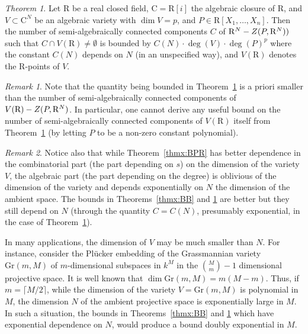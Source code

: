 \documentclass[10pt]{amsart}
\theoremstyle{definition}
\theoremstyle{remark}
\newtheorem{remark}{Remark}
\newtheorem{thmx}{Theorem}
\numberwithin{equation}{section}
\newcommand {\R} {\mathrm{R}}
\newcommand {\C}     {\mathrm{C}}
\newcommand {\ZZ} {{\rm Z}}
\begin{document}
\begin{thmx} \cite[Theorem 2.12]{Walsh2}
\label{thmx:Walsh}
Let $\R$ be a real closed field, $\C = \R[i]$ the algebraic closure of $\R$, and $V \subset \C^N$ be an algebraic variety with $\dim V = p$, and 
$P \in \R[X_1,\ldots,X_n]$.
Then the number of semi-algebraically connected components $C$  of 
$\R^N - \ZZ(P,\R^N))$ such that $C \cap V(\R) \neq \emptyset$ is bounded by
$ C(N) \cdot \deg(V) \cdot \deg(P)^p$ where the constant $C(N)$ depends on $N$
(in an unspecified way), and $V(\R)$ denotes the $\R$-points of $V$.
\end{thmx}

\begin{remark}
    Note that the quantity being bounded in Theorem~\ref{thmx:Walsh} is 
    a priori smaller than the number of semi-algebraically connected components of $V(\R) - \ZZ(P,\R^N)$. In particular, one cannot derive any useful bound on the number of semi-algebraically connected components of $V(\R)$ itself from Theorem~\ref{thmx:Walsh} (by letting $P$  to be a non-zero constant polynomial).
\end{remark}

\begin{remark}
Notice also that 
while Theorem~\ref{thmx:BPR} has better dependence in the combinatorial part (the part depending on $s$) on the dimension of the variety $V$, the algebraic part (the part depending on the degree) is oblivious 
of the dimension of the variety and depends exponentially on $N$ the dimension of the ambient space. The bounds in Theorems~\ref{thmx:BB} and \ref{thmx:Walsh} are better but they still depend on $N$ (through the quantity $C = C(N)$, presumably exponential,  in the case of Theorem~\ref{thmx:Walsh}). 
\end{remark}




In many applications, the dimension of $V$ may be much smaller than $N$.
For instance, consider the Pl\"{u}cker embedding of the Grassmannian variety
$\mathrm{Gr}(m,M)$ of $m$-dimensional subspaces in $k^{M}$ in the 
$\binom{M}{m} -1$ dimensional projective space. It is well known that 
$\dim \mathrm{Gr}(m,M) = m(M-m)$. Thus, if $m = \lceil M/2 \rceil$,
while the dimension of the variety $V = \mathrm{Gr}(m,M)$ is polynomial in $M$, the dimension $N$ of the ambient projective space is exponentially large in $M$. In such a situation, the bounds in Theorems~\ref{thmx:BB}
and \ref{thmx:Walsh} which have exponential dependence on $N$, would produce a bound doubly exponential in $M$.
\end{document}
